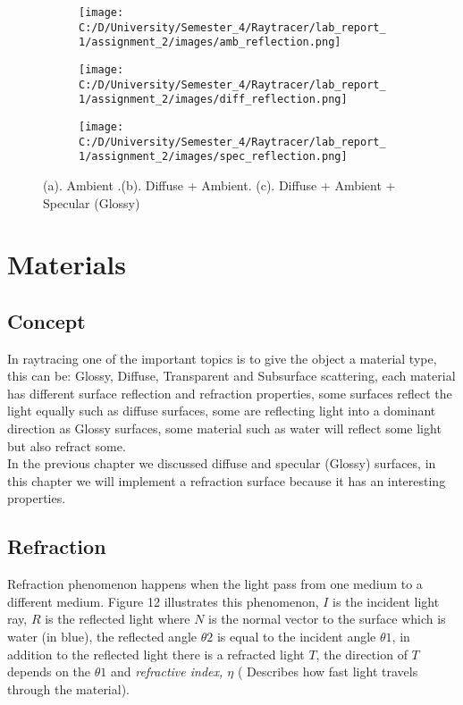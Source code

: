 \documentclass{article}
\begin{document}
\begin{figure}[ht]
	\begin{subfigure}{.3\textwidth}
		\centering
		\texttt{[image: C:/D/University/Semester\_4/Raytracer/lab\_report\_1/assignment\_2/images/amb\_reflection.png]}  
		\caption{}
		\label{fig:sub-first}
	\end{subfigure}
	\begin{subfigure}{.3\textwidth}
		\centering
		\texttt{[image: C:/D/University/Semester\_4/Raytracer/lab\_report\_1/assignment\_2/images/diff\_reflection.png]}  
		\caption{}
		\label{fig:sub-second}
	\end{subfigure}
	\begin{subfigure}{.3\textwidth}
		\centering
		\texttt{[image: C:/D/University/Semester\_4/Raytracer/lab\_report\_1/assignment\_2/images/spec\_reflection.png]}  
		\caption{}
		\label{fig:sub-third}
	\end{subfigure}
	
	\caption{(a). Ambient .(b). Diffuse + Ambient. (c). Diffuse + Ambient + Specular (Glossy)}
	\label{fig:fig}
\end{figure}

\bigbreak

\section{Materials}
	      \subsection{Concept}
	      In raytracing one of the important topics is to give the object a material type, this can be: Glossy, Diffuse, Transparent and Subsurface
	      scattering, each material has different surface reflection and refraction properties, some surfaces reflect the light equally such as diffuse surfaces, some are reflecting light into a dominant direction as Glossy surfaces, some material such as water will reflect some light but also refract some.
	      \\ 
	      In the previous chapter we discussed diffuse and specular (Glossy) surfaces, in this chapter we will implement a refraction surface because it has an interesting properties. 
	      
	      \subsection{Refraction}
	      Refraction phenomenon happens when the light pass from one medium to a different medium.
	      Figure 12 illustrates this phenomenon, $I$ is the incident light ray, $R$ is the reflected light where $N$ is the normal vector to the surface which is water (in blue), the reflected angle  $\theta2$ is equal to the incident angle $\theta1$, in addition to the reflected light there is a refracted light $T$, the direction of $T$ depends on the $\theta1$ and \textit{refractive index, $\eta$} ( Describes how fast light travels through the material).
	      
\end{document}
